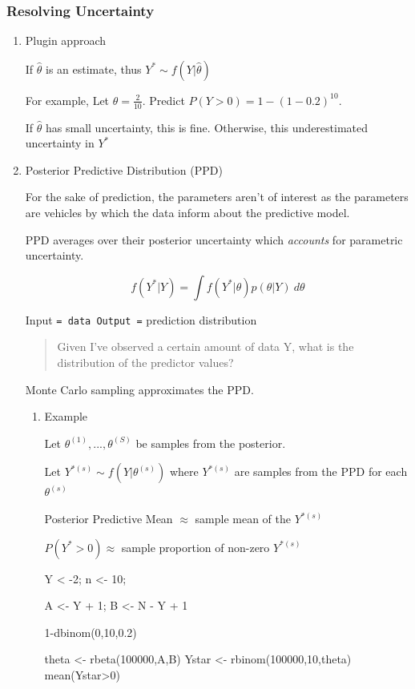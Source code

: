\documentclass[11pt]{article}
\begin{document}
\subsubsection{Resolving Uncertainty}
\label{sec:org38fb934}
\begin{enumerate}
\item Plugin approach
\label{sec:org4ef3b8c}

If \(\hat \theta\) is an estimate, thus \(Y^* \sim f(Y | \hat \theta)\)

For example, Let \(\hat \theta = \frac{2}{10}\). Predict \(P(Y > 0) = 1 - (1 -
0.2)^{10}\).

If \(\hat \theta\) has small uncertainty, this is fine. Otherwise, this
underestimated uncertainty in \(Y^*\)

\item Posterior Predictive Distribution (PPD)
\label{sec:orgced419f}

For the sake of prediction, the parameters aren't of interest as the parameters
are vehicles by which the data inform about the predictive model.

PPD averages over their posterior uncertainty which \emph{accounts} for parametric uncertainty.

$$
f(Y^* | Y) = \int f(Y^* | \theta) p(\theta | Y) \ d \theta
$$

Input \texttt{= data
Output =} prediction distribution

\begin{quote}
Given I've observed a certain amount of data Y, what is the distribution of the
predictor values?
\end{quote}

Monte Carlo sampling approximates the PPD.

\begin{enumerate}
\item Example
\label{sec:org4e8b29b}

Let \(\theta^{(1)}, ..., \theta^{(S)}\) be samples from the posterior.

Let \(Y^{*(s)} \sim f(Y | \theta^{(s)})\) where \(Y^{*(s)}\) are samples from the
PPD for each \(\theta^{(s)}\)

Posterior Predictive Mean \(\approx\) sample mean of the \(Y^{*(s)}\)

\(P(Y^* > 0) \approx\) sample proportion of non-zero \(Y^{*(s)}\)

\begin{R}
Y < -2; n <- 10;

A <- Y + 1;
B <- N - Y + 1

1-dbinom(0,10,0.2)

theta <- rbeta(100000,A,B)
Ystar <- rbinom(100000,10,theta)
mean(Ystar>0)
\end{R}
\end{enumerate}
\end{enumerate}
\end{document}
